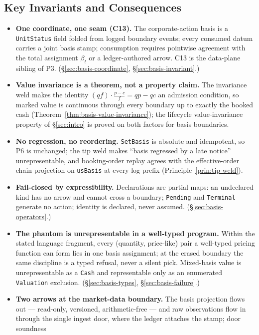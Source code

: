 \documentclass[11pt,a4paper]{article}
\begin{document}
\subsection*{Key Invariants and Consequences}

\begin{itemize}[nosep]
\item \textbf{One coordinate, one seam (C13).} The corporate-action basis is a
\texttt{UnitStatus} field folded from logged boundary events; every consumed datum
carries a joint basis stamp; consumption requires pointwise agreement with the total
assignment $\beta_t$ or a ledger-authored arrow. C13 is the data-plane sibling of P3.
(\S\ref{sec:basis-coordinate}, \S\ref{sec:basis-invariant}.)
\item \textbf{Value invariance is a theorem, not a property claim.} The invariance weld
makes the identity $(qf)\cdot\frac{p-c}{f}=qp-qc$ an admission condition, so marked
value is continuous through every boundary up to exactly the booked cash
(Theorem~\ref{thm:basis-value-invariance}); the lifecycle value-invariance property of
\S\ref{sec:intro} is proved on both factors for basis boundaries.
\item \textbf{No regression, no reordering.} \texttt{SetBasis} is absolute and
idempotent, so P6 is unchanged; the tip weld makes ``basis regressed by a late notice''
unrepresentable, and booking-order replay agrees with the effective-order chain
projection on \texttt{usBasis} at every log prefix
(Principle~\ref{prin:tip-weld}).
\item \textbf{Fail-closed by expressibility.} Declarations are partial maps: an
undeclared kind has no arrow and cannot cross a boundary; \texttt{Pending} and
\texttt{Terminal} generate no action; identity is declared, never assumed.
(\S\ref{sec:basis-operators}.)
\item \textbf{The phantom is unrepresentable in a well-typed program.} Within the stated language
fragment, every (quantity, price-like) pair a well-typed pricing function can form lies
in one basis assignment; at the erased boundary the same discipline is a typed refusal,
never a silent pick. Mixed-basis value is unrepresentable as a \texttt{Cash} and
representable only as an enumerated \texttt{Valuation} exclusion.
(\S\ref{sec:basis-types}, \S\ref{sec:basis-failure}.)
\item \textbf{Two arrows at the market-data boundary.} The basis projection flows
out --- read-only, versioned, arithmetic-free --- and raw observations flow in
through the single ingest door, where the ledger attaches the stamp; door soundness

\end{itemize}
\end{document}
